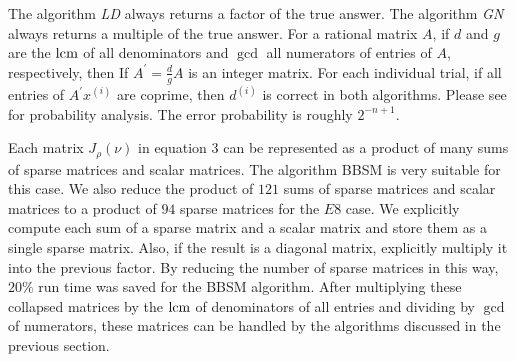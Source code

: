 The algorithm {\em LD}
always returns a factor of the true answer.
The algorithm {\em GN}
always returns a multiple of the true answer.
For a rational matrix $A$, if 
$d$ and $g$ are the $\mbox{lcm}$ of all denominators 
and $\gcd$ all numerators of entries of $A$, respectively,
then If $A^\prime = \frac{d}{g}A$ is an integer matrix.
For each individual trial,
if all entries of  $A^\prime x^{(i)}$ are coprime,
then $d^{(i)}$ is correct in both algorithms.
Please see \cite{Saunders::LA::2004} for probability analysis. 
The error probability is roughly $2^{-n + 1}$.

Each matrix $J_\rho(\nu)$ in equation 3 can be represented as
a product of many sums of sparse matrices and scalar matrices.
The algorithm BBSM is very suitable for this case.
We also reduce the product of $121$ sums of sparse matrices and scalar matrices
to a product of $94$ sparse matrices for the $E8$ case. 
We explicitly compute each sum of a sparse matrix and a scalar matrix and 
store them as a single sparse matrix.  Also, if the result is a diagonal matrix,
explicitly multiply it into the previous factor.
By reducing the number of sparse matrices in this way, 
$20\%$ run time was saved for the BBSM algorithm. 
After multiplying these collapsed matrices 
by the $\mbox{lcm}$ of denominators of all entries and dividing
by $\gcd$ of numerators, these matrices can be handled by the
algorithms discussed in the previous section.



